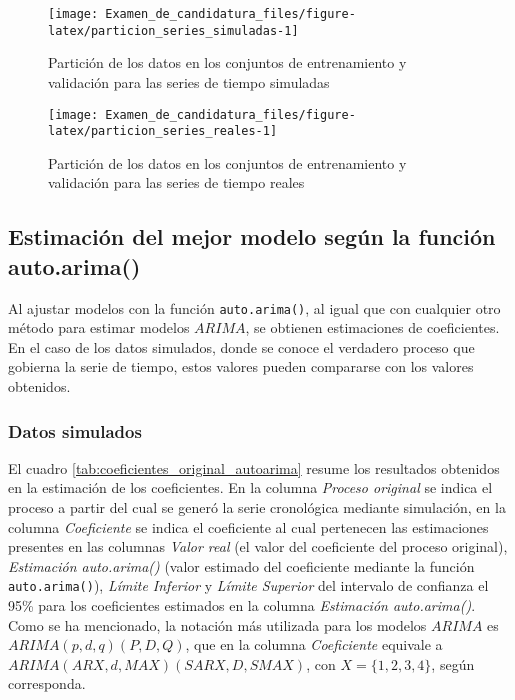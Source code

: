 \documentclass[
]{article}
\begin{document}
\begin{figure}[H]
\texttt{[image: Examen\_de\_candidatura\_files/figure-latex/particion\_series\_simuladas-1]} \caption{Partición de los datos en los conjuntos de entrenamiento y validación para las series de tiempo simuladas}\label{fig:particion_series_simuladas}
\end{figure}

\begin{figure}[H]
\texttt{[image: Examen\_de\_candidatura\_files/figure-latex/particion\_series\_reales-1]} \caption{Partición de los datos en los conjuntos de entrenamiento y validación para las series de tiempo reales}\label{fig:particion_series_reales}
\end{figure}

\subsection{Estimación del mejor modelo según la función auto.arima()}

Al ajustar modelos con la función \texttt{auto.arima()}, al igual que
con cualquier otro método para estimar modelos \(ARIMA\), se obtienen
estimaciones de coeficientes. En el caso de los datos simulados, donde
se conoce el verdadero proceso que gobierna la serie de tiempo, estos
valores pueden compararse con los valores obtenidos.

\subsubsection{Datos simulados}

El cuadro \ref{tab:coeficientes_original_autoarima} resume los
resultados obtenidos en la estimación de los coeficientes. En la columna
\emph{Proceso original} se indica el proceso a partir del cual se generó
la serie cronológica mediante simulación, en la columna
\emph{Coeficiente} se indica el coeficiente al cual pertenecen las
estimaciones presentes en las columnas \emph{Valor real} (el valor del
coeficiente del proceso original), \emph{Estimación auto.arima()} (valor
estimado del coeficiente mediante la función \texttt{auto.arima()}),
\emph{Límite Inferior} y \emph{Límite Superior} del intervalo de
confianza el 95\% para los coeficientes estimados en la columna
\emph{Estimación auto.arima()}. Como se ha mencionado, la notación más
utilizada para los modelos \(ARIMA\) es \(ARIMA(p,d,q)(P,D,Q)\), que en
la columna \emph{Coeficiente} equivale a
\(ARIMA(ARX, d, MAX)(SARX, D, SMAX)\), con \(X=\{1,2,3,4\}\), según
corresponda.
\end{document}
